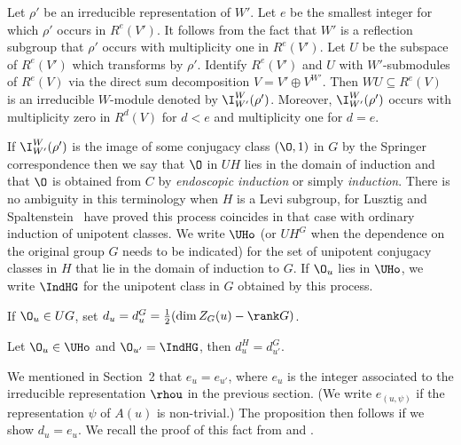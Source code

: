 Let $\rho'$ be an irreducible representation of $W'$.  Let $e$ be
the smallest 
integer
for which $\rho'$ occurs in $R^e(V')$.  It follows from the fact
that $W'$ is
a reflection subgroup that $\rho'$ occurs with multiplicity one
in $R^e(V')$.
Let $U$ be the subspace of $R^e(V')$
which transforms by $\rho'$.  Identify $R^e(V')$  and $U$ with
$W'$-submodules of $R^e(V)$ via the direct sum decomposition 
$V = V' \oplus V^{W'}$.  Then $WU \subseteq R^e(V)$ is an
irreducible
$W$-module denoted by $\I_{W'}^W (\rho')$.  Moreover, $\I_{W'}^W
(\rho')$
occurs with multiplicity zero in $R^d(V)$ for $d<e$ and
multiplicity one
for $d=e$.

If $\I_{W'}^W (\rho')$ is the image of some conjugacy class
$(\O,1)$ in $G$
by the Springer correspondence then we say that $\O$ in $UH$ lies
in the 
domain of induction and that $\O$ is obtained from $C$ by 
{\it endoscopic induction\/} or simply {\it induction}.  There is
no
ambiguity in this terminology when $H$ is a Levi subgroup, for
Lusztig
and Spaltenstein~\cite{LS} have proved this process coincides in
that case
with ordinary induction of unipotent classes.  We write $\UHo$
(or $UH^G$
when the dependence on the original group $G$ needs to be
indicated) for the
set of unipotent conjugacy classes in $H$ that lie in the domain
of induction
to $G$.  If $\O_u$ lies in $\UHo$, we write $\IndHG$ for the
unipotent class
in $G$ obtained by this process.

\newpage


\bigskip

If $\O_u \in UG$, set $d_u = d_u^G = \frac 12(\dim Z_G(u) - \rank
G)$.

 Let $\O_u \in \UHo$ and $\O_{u'} =
\IndHG$, then
     $d_u^H = d_{u'}^G$.
     \endproclaim

 We mentioned in Section~2 that $e_u = e_{u'}$, where
$e_u$ is 
the integer
associated to the irreducible representation $\rhou$ in the
previous section.
(We write $e_{(u,\psi)}$ if the representation $\psi$ of $A(u)$
is non-trivial.)
The proposition then follows if we show $d_u = e_u$.  We recall
the proof
of this fact from \cite{LS} and \cite{BM1}.

